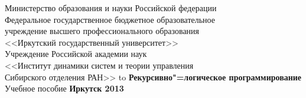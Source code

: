 \documentclass[12pt, openany, twoside, final]{extbook} %
\begin{document}

\renewcommand{\chaptername}{} %
\renewcommand{\refname}{Рекомендуемая литература} %
\renewcommand{\bibname}{\refname}
\begin{titlepage}
\thispagestyle{empty}
\begin{center}{\small{}
Министерство образования и науки
Российской федерации \\
Федеральное государственное бюджетное образовательное\\
учреждение высшего профессионального образования\\
<<Иркутский государственный университет>>\\[2ex]
    Учреждение Российской академии наук \\
<<Институт динамики систем и теории управления \\
Сибирского отделения РАН>>
}
\vfill
\hbox to \linewidth{\hfill\bfseries Е.~А.~Черкашин\hfill}
 \vspace{2em}
{\large\bfseries Рекурсивно"=логическое программирование}\\
 \vspace{2em}
{Учебное пособие}
\vfill
\vfill
 \textbf{Иркутск 2013}
\end{center}
\end{titlepage}
\end{document}
